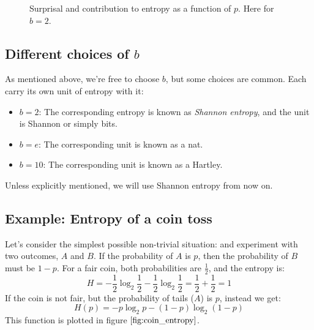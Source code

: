 \documentclass[12pt, a4paper]{article}
\numberwithin{equation}{section}
\begin{document}
\begin{figure}
\centering
{}
\caption{Surprisal and contribution to entropy as a function of $p$. Here for $b=2$.}
\label{fig:entropy_graph}
\end{figure}

\subsection{Different choices of $b$}
As mentioned above, we're free to choose $b$, but some choices are common. Each carry its own unit of entropy with it:
\begin{itemize}
\item $b=2$: The corresponding entropy is known as \textit{Shannon entropy}, and the unit is Shannon or simply bits.
\item $b=e$: The corresponding unit is known as a nat.
\item $b=10$: The corresponding unit is known as a Hartley.
\end{itemize}
Unless explicitly mentioned, we will use Shannon entropy from now on.

\subsection{Example: Entropy of a coin toss}
Let's consider the simplest possible non-trivial situation: and experiment with two outcomes, $A$ and $B$. If the probability of $A$ is $p$, then the probability of $B$ must be $1-p$.
For a fair coin, both probabilities are $\frac{1}{2}$, and the entropy is:
\begin{equation}
H=-\frac{1}{2}\log_2\frac{1}{2}-\frac{1}{2}\log_2\frac{1}{2}=\frac{1}{2}+\frac{1}{2}=1
\end{equation}
If the coin is not fair, but the probability of tails ($A$) is $p$, instead we get:
\begin{equation}
H(p)=-p\log_2 p-(1-p)\log_2(1-p)
\end{equation}
This function is plotted in figure $\ref{fig:coin_entropy}$.
\end{document}
